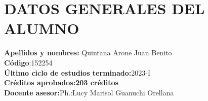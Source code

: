 \pagestyle{myheadings}
\chapter{DATOS GENERALES DEL ALUMNO}
		\noindent \textbf{Apellidos y nombres:} Quintana Arone Juan Benito \\
		\textbf{Código}:152254\\
		\textbf{Último ciclo de estudios terminado:}2023-I\\
		\textbf{Créditos aprobados:203 créditos }\\
		\textbf{Docente asesor:}Ph.:Lucy Marisol Guanuchi Orellana\\